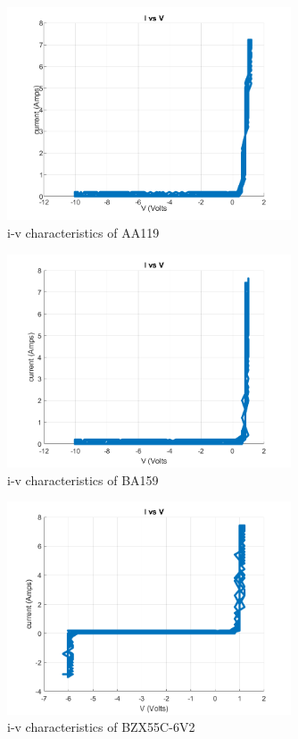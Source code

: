 \documentclass[letterpaper,12pt]{article}
\begin{document}
\begin{figure}[H]
    \centering
    \includegraphics[width = 0.75\textwidth]{1_aa119.png}
    \caption{i-v characteristics of AA119}
\end{figure} 


\begin{figure}[H]
    \centering
    \includegraphics[width = 0.75\textwidth]{1_ba159.png}
    \caption{i-v characteristics of BA159}
\end{figure} 


\begin{figure}[H]
    \centering
    \includegraphics[width = 0.75\textwidth]{1_zener.png}
    \caption{i-v characteristics of BZX55C-6V2}
\end{figure} 
\end{document}
